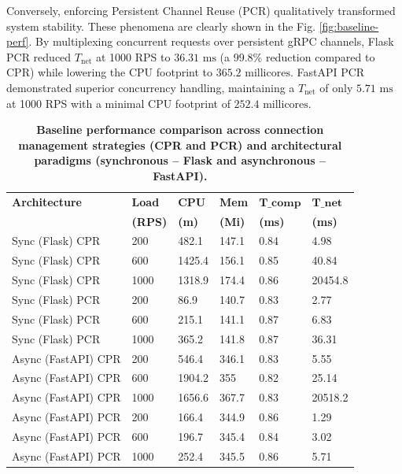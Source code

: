 \documentclass{ieeeaccess}
\begin{document}
Conversely, enforcing Persistent Channel Reuse (PCR) qualitatively transformed system stability. These phenomena are clearly shown in the Fig. \ref{fig:baseline-perf}. By multiplexing concurrent requests over persistent gRPC channels, Flask PCR reduced $T_{\text{net}}$ at 1000 RPS to $36.31\text{ ms}$ (a 99.8\% reduction compared to CPR) while lowering the CPU footprint to $365.2\text{ millicores}$. FastAPI PCR demonstrated superior concurrency handling, maintaining a $T_{\text{net}}$ of only $5.71\text{ ms}$ at 1000 RPS with a minimal CPU footprint of $252.4\text{ millicores}$.

\begin{table}[htbp]
	\centering
	\caption{\textbf{Baseline performance comparison across connection management strategies (CPR and PCR) and architectural paradigms (synchronous -- Flask and asynchronous -- FastAPI).}}
	\label{tab:baseline-comp}
	\setlength{\tabcolsep}{3pt}
	\begin{tabular}{llllll}
		\hline
		\textbf{Architecture}& \textbf{Load}& \textbf{CPU}& \textbf{Mem}& $\textbf{T_{comp}}$& $\textbf{T_{net}}$\\
		& \textbf{(RPS)}& \textbf{(m)}& \textbf{(Mi)}& \textbf{(ms)}& \textbf{(ms)}\\
		\hline
		Sync (Flask) CPR & 200  &  482.1 & 147.1 & 0.84 &    4.98 \\
		Sync (Flask) CPR & 600  & 1425.4 & 156.1 & 0.85 &   40.84 \\
		Sync (Flask) CPR & 1000 & 1318.9 & 174.4 & 0.86 & 20454.8 \\
		\hline
		Sync (Flask) PCR & 200  & 86.9  & 140.7 & 0.83 & 2.77 \\
		Sync (Flask) PCR & 600  & 215.1 & 141.1 & 0.87 & 6.83 \\
		Sync (Flask) PCR & 1000 & 365.2 & 141.8 & 0.87 & 36.31 \\
		\hline
		Async (FastAPI) CPR & 200  & 546.4  & 346.1 & 0.83 & 5.55 \\
		Async (FastAPI) CPR & 600  & 1904.2 & 355   & 0.82 & 25.14 \\
		Async (FastAPI) CPR & 1000 & 1656.6 & 367.7 & 0.83 & 20518.2 \\
		\hline
		Async (FastAPI) PCR & 200  & 166.4 & 344.9 & 0.86 & 1.29 \\
		Async (FastAPI) PCR & 600  & 196.7 & 345.4 & 0.84 & 3.02 \\
		Async (FastAPI) PCR & 1000 & 252.4 & 345.5 & 0.86 & 5.71 \\
		\hline
	\end{tabular}
\end{table}
\end{document}
